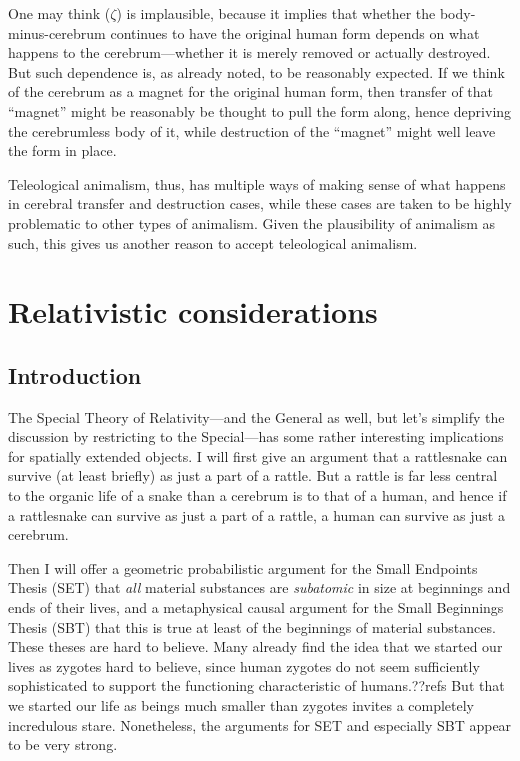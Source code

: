 One may think ($\zeta$) is implausible, because it implies that whether the body-minus-cerebrum continues to have the original human
form depends on what happens to the cerebrum---whether it is merely removed or actually destroyed. But such dependence is, as already
noted, to be reasonably expected. If we think of the cerebrum as a magnet for the original human form, then transfer of that ``magnet''
might be reasonably be thought to pull the form along, hence depriving the cerebrumless body of it, while destruction of the ``magnet'' might
well leave the form in place. 

Teleological animalism, thus, has multiple ways of making sense of what happens in cerebral transfer and destruction cases, while these cases
are taken to be highly problematic to other types of animalism. Given the plausibility of animalism as such, this gives us another reason to accept
teleological animalism.

\section{Relativistic considerations}
\subsection{Introduction}
The Special Theory of Relativity---and the General as well, but let's simplify the discussion by restricting to 
the Special---has some rather interesting implications for spatially extended objects. I will first give an argument
that a rattlesnake can survive (at least briefly) as just a part of a rattle. But a rattle is far less central to the organic
life of a snake than a cerebrum is to that of a human, and hence if a rattlesnake can survive as just a part of a rattle, a human
can survive as just a cerebrum. 

Then I will offer a geometric probabilistic argument for the Small Endpoints Thesis 
(SET) that \textit{all} material substances are \textit{subatomic} in size at beginnings and ends of their lives, 
and a metaphysical causal argument for the Small Beginnings Thesis (SBT) that this is true at least of the 
beginnings of material substances. These theses are hard to believe. Many already find the idea that we started 
our lives as zygotes hard to believe, since human zygotes do not seem sufficiently sophisticated to support the 
functioning characteristic of humans.??refs But that we started our life as beings much smaller than zygotes invites 
a completely incredulous stare. Nonetheless, the arguments for SET and especially SBT appear to be very strong.


